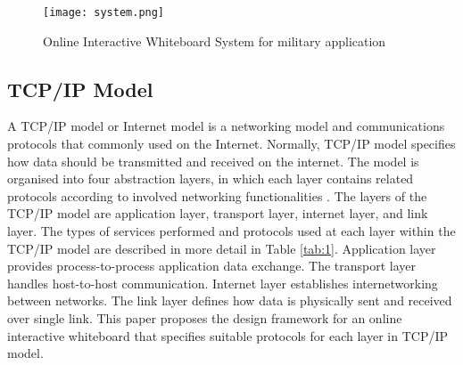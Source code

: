 \documentclass[conference]{IEEEtran}
\begin{document}
\begin{figure}[t]
\begin{center}
\texttt{[image: system.png]}
\caption{Online Interactive Whiteboard System for military application}
\label{fig:1}
\end{center}
\end{figure}

\subsection{TCP/IP Model}

A TCP/IP model or Internet model is a networking model and communications protocols that commonly used on the Internet. 
Normally, TCP/IP model specifies how data should be transmitted and received on the internet. The model is organised into four abstraction layers, in which each layer contains related protocols according to involved networking functionalities \cite{RFC1122, RFC1123}.
The layers of the TCP/IP model are application layer, transport layer, internet layer, and link layer. 
The types of services performed and protocols used at each layer within the TCP/IP model are described in more detail in Table \ref{tab:1}. 
Application layer provides process-to-process application data exchange. 
The transport layer handles host-to-host communication. Internet layer establishes internetworking between networks. 
The link layer defines how data is physically sent and received over single link. 
This paper proposes the design framework for an online interactive whiteboard that specifies suitable protocols for each layer in TCP/IP model.
\end{document}
